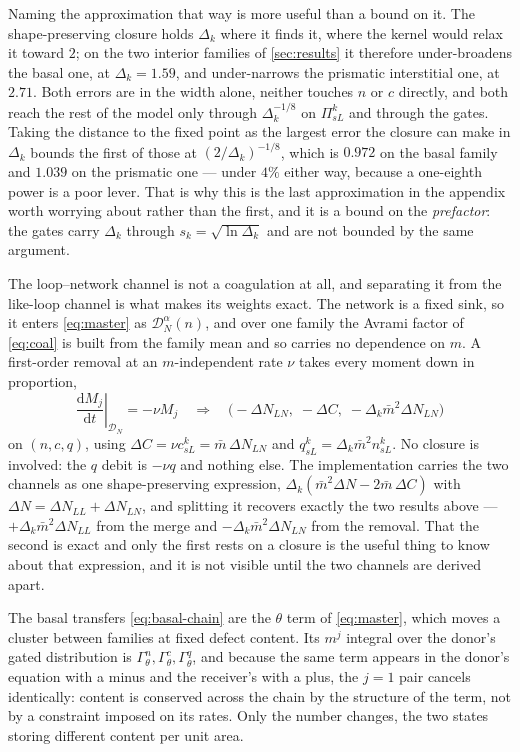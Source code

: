Naming the approximation that way is more useful than a bound on it. The
shape-preserving closure holds $\Delta_k$ where it finds it, where the kernel
would relax it toward $2$; on the two interior families of \cref{sec:results} it
therefore under-broadens the basal one, at $\Delta_k=1.59$, and under-narrows
the prismatic interstitial one, at $2.71$. Both errors are in the width alone,
neither touches $n$ or $c$ directly, and both reach the rest of the model only
through $\Delta_k^{-1/8}$ on $\Pi^k_{sL}$ and through the gates. Taking the
distance to the fixed point as the largest error the closure can make in
$\Delta_k$ bounds the first of those at $(2/\Delta_k)^{-1/8}$, which is $0.972$
on the basal family and $1.039$ on the prismatic one --- under $4\%$ either way,
because a one-eighth power is a poor lever. That is why this is the last
approximation in the appendix worth worrying about rather than the first, and it
is a bound on the \emph{prefactor}: the gates carry $\Delta_k$ through
$s_k=\sqrt{\ln\Delta_k}$ and are not bounded by the same argument.

The loop--network channel is not a coagulation at all, and separating it from
the like-loop channel is what makes its weights exact. The network is a fixed
sink, so it enters \cref{eq:master} as $\mathcal D^{\alpha}_{N}(n)$, and over one
family the Avrami factor of \cref{eq:coal} is built from the family mean and so
carries no dependence on $m$. A first-order removal at an $m$-independent rate
$\nu$ takes every moment down in proportion,
\begin{equation}
  \left.\frac{\mathrm dM_j}{\mathrm dt}\right|_{\mathcal D_N}=-\nu M_j
  \quad\Longrightarrow\quad
  \bigl(-\Delta N_{LN},\;-\Delta C,\;-\Delta_k\bar m^{2}\Delta N_{LN}\bigr)
  \label{eq:d-LN}
\end{equation}
on $(n,c,q)$, using $\Delta C=\nu c^k_{sL}=\bar m\,\Delta N_{LN}$ and
$q^k_{sL}=\Delta_k\bar m^{2}n^k_{sL}$. No closure is involved: the $q$ debit is
$-\nu q$ and nothing else. The implementation carries the two channels as one
shape-preserving expression,
$\Delta_k(\bar m^{2}\Delta N-2\bar m\,\Delta C)$ with
$\Delta N=\Delta N_{LL}+\Delta N_{LN}$, and splitting it recovers exactly the two
results above --- $+\Delta_k\bar m^{2}\Delta N_{LL}$ from the merge and
$-\Delta_k\bar m^{2}\Delta N_{LN}$ from the removal. That the second is exact and
only the first rests on a closure is the useful thing to know about that
expression, and it is not visible until the two channels are derived apart.

The basal transfers \cref{eq:basal-chain} are the $\theta$ term of
\cref{eq:master}, which moves a cluster between families at fixed defect
content. Its $m^{j}$ integral over the donor's gated distribution is
$\Gamma^{n}_{\theta},\Gamma^{c}_{\theta},\Gamma^{q}_{\theta}$, and because the
same term appears in the donor's equation with a minus and the receiver's with a
plus, the $j=1$ pair cancels identically: content is conserved across the chain
by the structure of the term, not by a constraint imposed on its rates. Only the
number changes, the two states storing different content per unit area.

